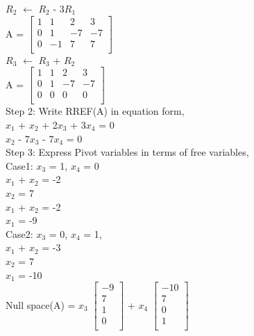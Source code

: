 \documentclass{article}
\begin{document}
$R_2$ $\leftarrow$ $R_2$ - $3R_1$\\

A = $\begin{bmatrix}
    1 & 1 & 2 & 3\\
    0 & 1 & -7 & -7\\
    0 & -1 & 7 & 7 \\
    \end{bmatrix}$ \\

$R_3$ $\leftarrow$ $R_3$ + $R_2$\\

A = $\begin{bmatrix}
    1 & 1 & 2 & 3\\
    0 & 1 & -7 & -7\\
    0 & 0 & 0 & 0 \\
    \end{bmatrix}$ \\

Step 2: Write RREF(A) in equation form,\\

$x_1$ + $x_2$ + 2$x_3$ + 3$x_4$ = 0\\

 $x_2$ - 7$x_3$ - 7$x_4$ = 0 \\
 
Step 3: Express Pivot variables in terms of free variables,\\

Case1: $x_3$ = 1, $x_4$ = 0 \\

$x_1$ + $x_2$ = -2 \\

$x_2$ = 7 \\ 

 $x_1$ + $x_2$ = -2 \\

$x_1$ = -9 \\

Case2: $x_3$ = 0, $x_4$ = 1,\\

$x_1$ + $x_2$ = -3 \\

$x_2$ = 7 \\
 
 $x_1$ = -10 \\
 
 Null space(A) = $x_3$ $\begin{bmatrix}
    -9 \\
    7 \\
    1 \\
    0 \\
    \end{bmatrix}$  +  $x_4$ $\begin{bmatrix}
    -10 \\
    7 \\
    0 \\
    1 \\
     \end{bmatrix}$ \\ \\
     
\end{document}
